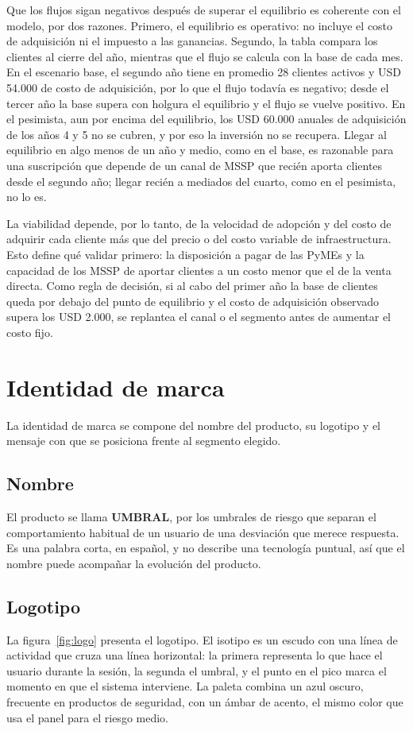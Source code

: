 Que los flujos sigan negativos después de superar el equilibrio es coherente con el modelo, por dos
razones. Primero, el equilibrio es operativo: no incluye el costo de adquisición ni el impuesto a las
ganancias. Segundo, la tabla compara los clientes al cierre del año, mientras que el flujo se calcula con
la base de cada mes. En el escenario base, el segundo año tiene en promedio 28 clientes activos y
USD 54.000 de costo de adquisición, por lo que el flujo todavía es negativo; desde el tercer año la
base supera con holgura el equilibrio y el flujo se vuelve positivo. En el pesimista, aun por encima
del equilibrio, los USD 60.000 anuales de adquisición de los años 4 y 5 no se cubren, y por eso la
inversión no se recupera. Llegar al equilibrio en algo menos de un año y medio, como en el base, es
razonable para una suscripción que depende de un canal de MSSP que recién aporta clientes desde el
segundo año; llegar recién a mediados del cuarto, como en el pesimista, no lo es.

La viabilidad depende, por lo tanto, de la velocidad de adopción y del costo de adquirir cada cliente
más que del precio o del costo variable de infraestructura. Esto define qué validar primero: la
disposición a pagar de las PyMEs y la capacidad de los MSSP de aportar clientes a un costo menor que
el de la venta directa. Como regla de decisión, si al cabo del primer año la base de clientes queda
por debajo del punto de equilibrio y el costo de adquisición observado supera los USD 2.000, se
replantea el canal o el segmento antes de aumentar el costo fijo.

\section{Identidad de marca}

La identidad de marca se compone del nombre del producto, su logotipo y el mensaje con que se posiciona frente al segmento elegido.
\subsection{Nombre}
El producto se llama \textbf{UMBRAL}, por los umbrales de riesgo que separan el comportamiento habitual de un usuario de una desviación que merece respuesta. Es una palabra corta, en español, y no describe una tecnología puntual, así que el nombre puede acompañar la evolución del producto.

\subsection{Logotipo}
La figura~\ref{fig:logo} presenta el logotipo. El isotipo es un escudo con una línea de actividad que cruza una línea horizontal: la primera representa lo que hace el usuario durante la sesión, la segunda el umbral, y el punto en el pico marca el momento en que el sistema interviene. La paleta combina un azul oscuro, frecuente en productos de seguridad, con un ámbar de acento, el mismo color que usa el panel para el riesgo medio.

